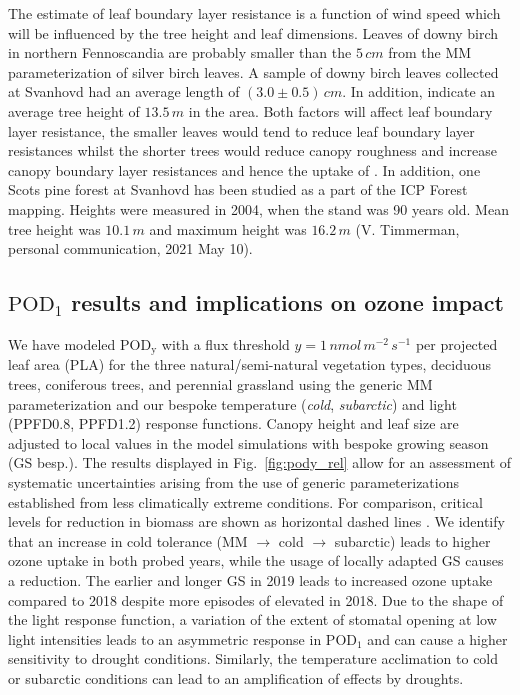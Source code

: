 \documentclass[bg, manuscript]{copernicus}
\begin{document}
The estimate of leaf boundary layer resistance is a function of wind speed which will be influenced by the tree height and leaf dimensions. Leaves of downy birch in northern Fennoscandia are probably smaller than the $5\,\unit{cm}$ from the MM parameterization of silver birch leaves. A sample of downy birch leaves collected at Svanhovd had an average length of $(3.0\pm 0.5)\,\unit{cm}$. In addition, \citet[][p.~52]{NINA2004} indicate an average tree height of $13.5\,\unit{m}$ in the area. Both factors will affect leaf boundary layer resistance, the smaller leaves would tend to reduce leaf boundary layer resistances whilst the shorter trees would reduce canopy roughness and increase canopy boundary layer resistances and hence the uptake of . In addition, one Scots pine forest at Svanhovd has been studied as a part of the ICP Forest mapping. Heights were measured in 2004, when the stand was 90 years old. Mean tree height was $10.1\,\unit{m}$ and maximum height was $16.2\,\unit{m}$ (V. Timmerman, personal communication, 2021 May 10).


\subsection{$\mathrm{POD_1}$ results and implications on ozone impact}
\label{subsec:do3se_results}

We have modeled $\mathrm{POD_y}$ with a flux threshold $y=1\,\unit{nmol\,m^{-2}\,s^{-1}}$ per projected leaf area (PLA) for the three natural/semi-natural vegetation types, deciduous trees, coniferous trees, and perennial grassland using the generic MM parameterization and our bespoke temperature (\emph{cold}, \emph{subarctic}) and light (PPFD0.8, PPFD1.2) response functions. Canopy height and leaf size are adjusted to local values in the model simulations with bespoke growing season (GS besp.). The results displayed in Fig.~\ref{fig:pody_rel} allow for an assessment of systematic uncertainties arising from the use of generic parameterizations established from less climatically extreme conditions.
For comparison, critical levels for reduction in biomass are shown as horizontal dashed lines \citep[deciduous forest $4\,\unit{\%}$, coniferous forest $2\,\unit{\%}$, and grasslands $10\,\unit{\%}$ biomass reduction,][]{ICP:MappingManual2017,ESPR:Hayes2021}. We identify that an increase in cold tolerance (MM $\rightarrow$ cold $\rightarrow$ subarctic) leads to higher ozone uptake in both probed years, while the usage of locally adapted GS causes a reduction. The earlier and longer GS in 2019 leads to increased ozone uptake compared to 2018 despite more episodes of elevated \chem{[O_3]} in 2018. Due to the shape of the light response function, a variation of the extent of stomatal opening at low light intensities leads to an asymmetric response in $\mathrm{POD_1}$ and can cause a higher sensitivity to drought conditions. Similarly, the temperature acclimation to cold or subarctic conditions can lead to an amplification of effects by droughts. 
\end{document}
